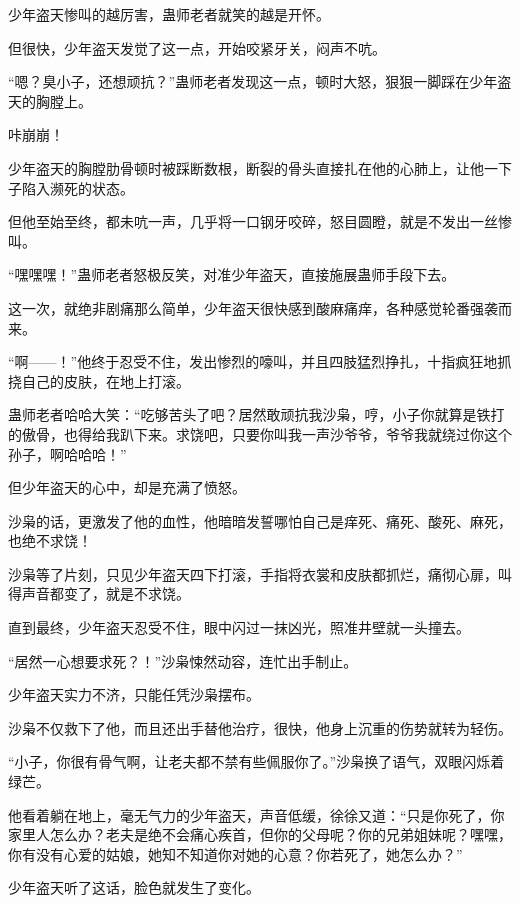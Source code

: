 
\begin{this_body}



少年盗天惨叫的越厉害，蛊师老者就笑的越是开怀。

但很快，少年盗天发觉了这一点，开始咬紧牙关，闷声不吭。

“嗯？臭小子，还想顽抗？”蛊师老者发现这一点，顿时大怒，狠狠一脚踩在少年盗天的胸膛上。

咔崩崩！

少年盗天的胸膛肋骨顿时被踩断数根，断裂的骨头直接扎在他的心肺上，让他一下子陷入濒死的状态。

但他至始至终，都未吭一声，几乎将一口钢牙咬碎，怒目圆瞪，就是不发出一丝惨叫。

“嘿嘿嘿！”蛊师老者怒极反笑，对准少年盗天，直接施展蛊师手段下去。

这一次，就绝非剧痛那么简单，少年盗天很快感到酸麻痛痒，各种感觉轮番强袭而来。

“啊——！”他终于忍受不住，发出惨烈的嚎叫，并且四肢猛烈挣扎，十指疯狂地抓挠自己的皮肤，在地上打滚。

蛊师老者哈哈大笑：“吃够苦头了吧？居然敢顽抗我沙枭，哼，小子你就算是铁打的傲骨，也得给我趴下来。求饶吧，只要你叫我一声沙爷爷，爷爷我就绕过你这个孙子，啊哈哈哈！”

但少年盗天的心中，却是充满了愤怒。

沙枭的话，更激发了他的血性，他暗暗发誓哪怕自己是痒死、痛死、酸死、麻死，也绝不求饶！

沙枭等了片刻，只见少年盗天四下打滚，手指将衣裳和皮肤都抓烂，痛彻心扉，叫得声音都变了，就是不求饶。

直到最终，少年盗天忍受不住，眼中闪过一抹凶光，照准井壁就一头撞去。

“居然一心想要求死？！”沙枭悚然动容，连忙出手制止。

少年盗天实力不济，只能任凭沙枭摆布。

沙枭不仅救下了他，而且还出手替他治疗，很快，他身上沉重的伤势就转为轻伤。

“小子，你很有骨气啊，让老夫都不禁有些佩服你了。”沙枭换了语气，双眼闪烁着绿芒。

他看着躺在地上，毫无气力的少年盗天，声音低缓，徐徐又道：“只是你死了，你家里人怎么办？老夫是绝不会痛心疾首，但你的父母呢？你的兄弟姐妹呢？嘿嘿，你有没有心爱的姑娘，她知不知道你对她的心意？你若死了，她怎么办？”

少年盗天听了这话，脸色就发生了变化。


\end{this_body}
